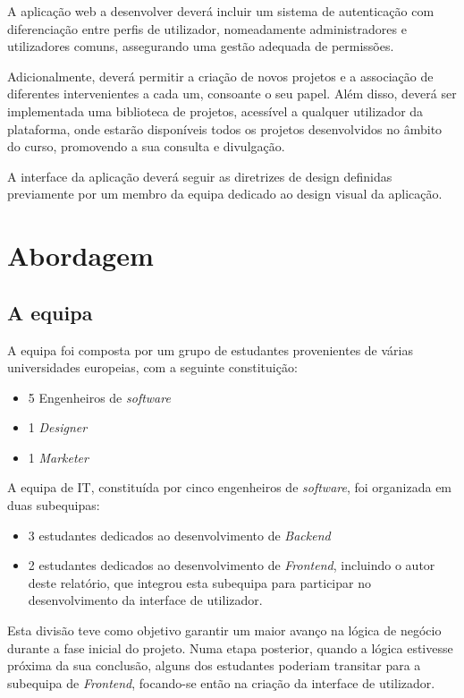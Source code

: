 A aplicação web a desenvolver deverá incluir um sistema de autenticação com diferenciação entre perfis de utilizador, nomeadamente administradores e utilizadores comuns, assegurando uma gestão adequada de permissões. 

Adicionalmente, deverá permitir a criação de novos projetos e a associação de diferentes intervenientes a cada um, consoante o seu papel. Além disso, deverá ser implementada uma biblioteca de projetos, acessível a qualquer utilizador da plataforma, onde estarão disponíveis todos os projetos desenvolvidos no âmbito do curso, promovendo a sua consulta e divulgação.

A interface da aplicação deverá seguir as diretrizes de design definidas previamente por um membro da equipa dedicado ao design visual da aplicação.


\section{Abordagem}

\subsection{A equipa}

A equipa foi composta por um grupo de estudantes provenientes de várias universidades europeias, com a seguinte constituição:

\begin{itemize}
    \item 5 Engenheiros de \textit{software}
    \item 1 \textit{Designer}
    \item 1 \textit{Marketer}
\end{itemize}

A equipa de IT, constituída por cinco engenheiros de \textit{software}, foi organizada em duas subequipas: 
\begin{itemize}
    \item 3 estudantes dedicados ao desenvolvimento de \textit{Backend}
    \item 2 estudantes dedicados ao desenvolvimento de \textit{Frontend}, incluindo o autor deste relatório, que integrou esta subequipa para participar no desenvolvimento da interface de utilizador.
\end{itemize}

Esta divisão teve como objetivo garantir um maior avanço na lógica de negócio durante a fase inicial do projeto. 
Numa etapa posterior, quando a lógica estivesse próxima da sua conclusão, alguns dos estudantes poderiam transitar para a subequipa de \textit{Frontend}, focando-se então na criação da interface de utilizador.

